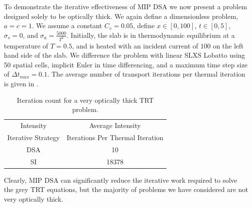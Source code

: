 To demonstrate the iterative effectiveness of MIP DSA we now present a problem designed solely to be optically thick.
We again define a dimensionless problem, $a=c=1$.
We assume a constant $C_v = 0.05$, define $x\in[0,100]$, $t\in[0,5]$, $\sigma_s = 0$, and $\sigma_a = \frac{5000}{T^2}$.
Initially, the slab is in thermodynamic equilibrium at a temperature of $T=0.5$, and is heated with an incident current of $100$ on the left hand side of the slab.
We difference the problem with linear SLXS Lobatto using 50 spatial cells, implicit Euler in time differencing, and a maximum time step size of $\Delta t_{max} = 0.1$.
The average number of transport iterations per thermal iteration is given in .
\begin{table}[!ht]
\centering
\caption{Iteration count for a very optically thick TRT problem.}
\label{tbl:high_iter_count}
\begin{tabular}{|c|c|}
\hline
Intensity  						& Average Intensity					\\				
Iterative Strategy		& Iterations Per Thermal Iteration \\
\hline
DSA		&   10  \\ 
\hline
SI  &   18378 \\
\hline
\end{tabular}
\end{table}
Clearly, MIP DSA can significantly reduce the iterative work required to solve the grey TRT equations, but the majority of problems we have considered are not very optically thick.

